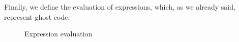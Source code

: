 \vspace{1cm}
Finally, we define the evaluation of expressions, which, as we already said, represent ghost code.




\begin{figure}[hbp]
\begin{minipage}{\textwidth}
\footnotesize{
}
\caption{\LangOO Expression evaluation}
\label{f:evaluation}
\end{minipage}
\end{figure}

